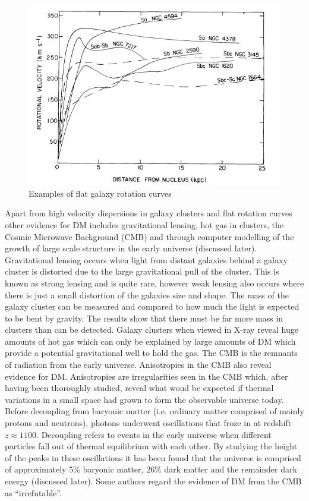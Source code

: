 \documentclass[a4paper,12pt]{article}
\begin{document}
\begin{figure}[H]
\centering
\includegraphics[width=.9\textwidth]{./rotationcurves.jpg}
\caption{Examples of flat galaxy rotation curves \citep{ruben}}
\label{fig:1}
\end{figure}

Apart from high velocity dispersions in galaxy clusters and flat rotation curves other evidence for DM includes gravitational lensing, hot gas in clusters, the Cosmic Microwave Background (CMB)
 and through computer modelling of the growth of 
large scale structure in the early universe (discussed later). Gravitational lensing occurs when light from distant galaxies behind a galaxy cluster is distorted due to the 
large gravitational pull of the cluster. This is known as strong lensing and is quite rare, however weak lensing also occurs where there is just a small distortion of the galaxies size
and shape. 
The mass of the galaxy cluster can be measured and compared to how much the light is expected to be bent by gravity. The results show that there must be far more mass in clusters 
than can be detected. Galaxy clusters when viewed in X-ray reveal huge amounts of hot gas which can only be explained by large amounts of DM which provide a potential gravitational well to hold the gas.
The CMB is the remnants of radiation from the early universe. Anisotropies in the CMB also reveal evidence for DM. Anisotropies are irregularities seen in the CMB which, after having been
thoroughly studied, reveal what woud be expected if thermal variations in a small space had grown to form the observable universe today.
Before decoupling from baryonic matter (i.e. ordinary matter comprised of 
mainly protons and neutrons), photons underwent oscillations that froze in at redshift $z\approx1100$. Decoupling refers to events in the early universe when different
particles fall out of thermal equilibrium with each other.
By studying the height of the peaks in these oscillations it has been 
found that the universe is comprised of approximately 5\% baryonic matter, 26\% dark matter
and the remainder dark energy (discussed later). Some authors \citep{freese} regard the evidence of DM from the CMB as ``irrefutable''.
\end{document}
